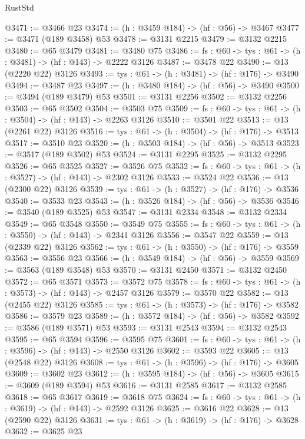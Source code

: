 \begin{lexlean}{RustStd}
\begin{coremodule}
{\begin{coremodule}
{{{{{{{{{{{{@3471 := @3466 @23
@3474 := (h : @3459 @184) -> (hf : @56) -> @3467
@3477 := @3471 (@189 @3458) @53
@3478 := @3131 @2215
@3479 := @3132 @2215
@3480 := @65 @3479
@3481 := @3480 @75
@3486 := {fs : @60} -> {tys : @61} -> (h : @3481) -> (hf : @143) -> @2222 @3126
@3487 := @3478 @22
@3490 := @13 (@2220 @22) @3126
@3493 := {tys : @61} -> (h : @3481) -> (hf : @176) -> @3490
@3494 := @3487 @23
@3497 := (h : @3480 @184) -> (hf : @56) -> @3490
@3500 := @3494 (@189 @3479) @53
@3501 := @3131 @2256
@3502 := @3132 @2256
@3503 := @65 @3502
@3504 := @3503 @75
@3509 := {fs : @60} -> {tys : @61} -> (h : @3504) -> (hf : @143) -> @2263 @3126
@3510 := @3501 @22
@3513 := @13 (@2261 @22) @3126
@3516 := {tys : @61} -> (h : @3504) -> (hf : @176) -> @3513
@3517 := @3510 @23
@3520 := (h : @3503 @184) -> (hf : @56) -> @3513
@3523 := @3517 (@189 @3502) @53
@3524 := @3131 @2295
@3525 := @3132 @2295
@3526 := @65 @3525
@3527 := @3526 @75
@3532 := {fs : @60} -> {tys : @61} -> (h : @3527) -> (hf : @143) -> @2302 @3126
@3533 := @3524 @22
@3536 := @13 (@2300 @22) @3126
@3539 := {tys : @61} -> (h : @3527) -> (hf : @176) -> @3536
@3540 := @3533 @23
@3543 := (h : @3526 @184) -> (hf : @56) -> @3536
@3546 := @3540 (@189 @3525) @53
@3547 := @3131 @2334
@3548 := @3132 @2334
@3549 := @65 @3548
@3550 := @3549 @75
@3555 := {fs : @60} -> {tys : @61} -> (h : @3550) -> (hf : @143) -> @2341 @3126
@3556 := @3547 @22
@3559 := @13 (@2339 @22) @3126
@3562 := {tys : @61} -> (h : @3550) -> (hf : @176) -> @3559
@3563 := @3556 @23
@3566 := (h : @3549 @184) -> (hf : @56) -> @3559
@3569 := @3563 (@189 @3548) @53
@3570 := @3131 @2450
@3571 := @3132 @2450
@3572 := @65 @3571
@3573 := @3572 @75
@3578 := {fs : @60} -> {tys : @61} -> (h : @3573) -> (hf : @143) -> @2457 @3126
@3579 := @3570 @22
@3582 := @13 (@2455 @22) @3126
@3585 := {tys : @61} -> (h : @3573) -> (hf : @176) -> @3582
@3586 := @3579 @23
@3589 := (h : @3572 @184) -> (hf : @56) -> @3582
@3592 := @3586 (@189 @3571) @53
@3593 := @3131 @2543
@3594 := @3132 @2543
@3595 := @65 @3594
@3596 := @3595 @75
@3601 := {fs : @60} -> {tys : @61} -> (h : @3596) -> (hf : @143) -> @2550 @3126
@3602 := @3593 @22
@3605 := @13 (@2548 @22) @3126
@3608 := {tys : @61} -> (h : @3596) -> (hf : @176) -> @3605
@3609 := @3602 @23
@3612 := (h : @3595 @184) -> (hf : @56) -> @3605
@3615 := @3609 (@189 @3594) @53
@3616 := @3131 @2585
@3617 := @3132 @2585
@3618 := @65 @3617
@3619 := @3618 @75
@3624 := {fs : @60} -> {tys : @61} -> (h : @3619) -> (hf : @143) -> @2592 @3126
@3625 := @3616 @22
@3628 := @13 (@2590 @22) @3126
@3631 := {tys : @61} -> (h : @3619) -> (hf : @176) -> @3628
@3632 := @3625 @23
}}}}}}}}}}}}
\end{coremodule}}
\end{coremodule}
\end{lexlean}

